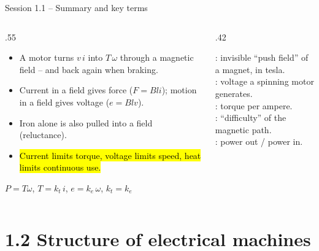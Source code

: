 \documentclass[aspectratio=169,10pt]{beamer}
\begin{document}
\begin{frame}{Session 1.1 -- Summary and key terms}
\begin{columns}[T]
\begin{column}{.55\textwidth}
\small
\begin{itemize}
\item A motor turns $v\,i$ into $T\,\omega$ through a magnetic field -- and back again when braking.
\item Current in a field gives force ($F=Bli$); motion in a field gives voltage ($e=Blv$).
\item Iron alone is also pulled into a field (reluctance).
\item \hl{Current limits torque, voltage limits speed, heat limits continuous use.}
\end{itemize}
\begin{keybox}[Remember]
$P=T\omega$, \quad $T=k_t\,i$, \quad $e=k_e\,\omega$, \quad $k_t=k_e$
\end{keybox}
\end{column}
\begin{column}{.42\textwidth}
\begin{defbox}
\small
{}: invisible ``push field'' of a magnet, in tesla.\\
: voltage a spinning motor generates.\\
: torque per ampere.\\
: ``difficulty'' of the magnetic path.\\
: power out / power in.
\end{defbox}
\end{column}
\end{columns}
\end{frame}

\section{1.2 Structure of electrical machines}
\end{document}
